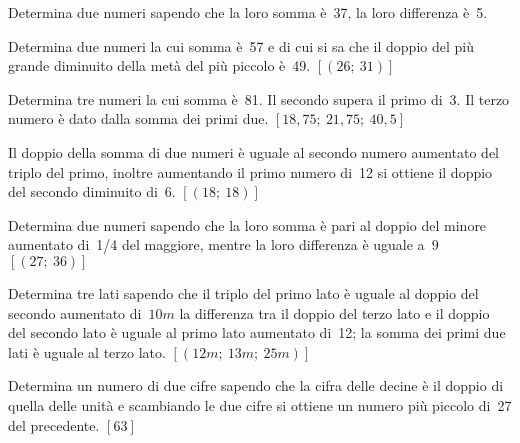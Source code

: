 \newpage
\begin{multicols}{2}
\begin{esercizio}
 \label{ese:22.77}
Determina due numeri sapendo che la loro somma è~37, la loro
differenza è~5.
\end{esercizio}

\begin{esercizio}[]
 \label{ese:22.81}
Determina due numeri la cui somma è~57 e di cui si sa che il doppio del più 
grande diminuito della metà del più piccolo è~49.
\hfill \(\left[(26;~31)\right]\)
\end{esercizio}

\begin{esercizio}[\Ast]
 \label{ese:22.79}
Determina tre numeri la cui somma è~81. Il secondo supera il primo
di~3. Il terzo numero è dato dalla somma dei primi due. 
\hfill \(\left[18,75;~21,75;~40,5\right]\)
\end{esercizio}

\begin{esercizio}[\Ast]
 \label{ese:22.78}
Il doppio della somma di due numeri è uguale al secondo numero aumentato
del triplo del primo, inoltre aumentando il primo numero di~12 si
ottiene il doppio del secondo diminuito di~6. 
\hfill \(\left[(18;~18)\right]\)
\end{esercizio}

\begin{esercizio}[\Ast]
 \label{ese:22.80}
Determina due numeri sapendo che la loro somma è pari al doppio del minore 
aumentato di~1/4
del maggiore, mentre la loro differenza è uguale a~\(9\)
\hfill \(\left[(27;~36)\right]\)
\end{esercizio}

\begin{esercizio}[\Ast]
 \label{ese:22.82}
Determina tre lati sapendo che il triplo del primo lato è
uguale al doppio del secondo aumentato di~\(10\unit{m}\) la differenza tra il
doppio del terzo lato e il doppio del secondo lato è uguale al primo
lato aumentato di~12; la somma dei primi due lati è uguale al terzo
lato.
\hfill \(\left[(12\unit{m};~13\unit{m};~25\unit{m})\right]\)
\end{esercizio}

\begin{esercizio}[\Ast]
 \label{ese:22.83}
Determina un numero di due cifre sapendo che la cifra delle decine
è il doppio di quella delle unità e scambiando le due cifre si
ottiene un numero più piccolo di~27 del precedente.
\hfill \(\left[63\right]\)
\end{esercizio}


\end{multicols}
